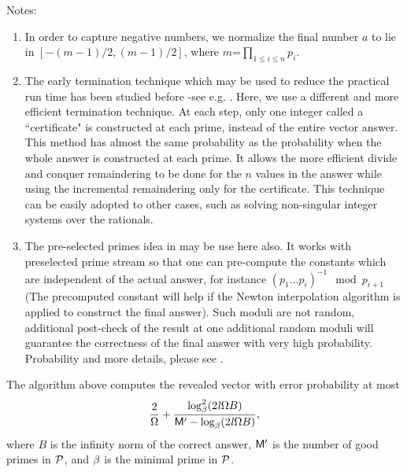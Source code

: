 Notes:
\begin{enumerate}
\item
In order to capture negative numbers, 
we normalize the final number $a$ to lie in $[-(m-1)/2, (m-1)/2]$, 
where $m$=$\prod_{1\leq i \leq n} p_i$.
\item
The early termination technique which may be used to reduce 
the practical run time
has been studied before -see e.g. \cite{Emiris98,Kaltofen02, Eberly03}.
Here, we use a different and more efficient termination technique.
At each step, only one integer called a ``certificate" is constructed 
at each prime, instead of the entire vector answer. This method has almost
the same probability as the probability when the whole answer is constructed at each prime.  It allows the more efficient divide and conquer remaindering
to be done for the $n$ values in the answer while using the incremental
remaindering only for the certificate.
This technique can be easily adopted to other cases,
such as solving non-singular integer systems over the rationals.
\item
The pre-selected primes idea in \cite{Kaltofen02} may be use here also. 
It works with preselected prime stream%
so that one can pre-compute the constants 
which are independent of the actual answer,
for instance $(p_1 \ldots p_i)^{-1} \mod p_{i+1}$ (The precomputed constant 
will help if the Newton interpolation algorithm is applied to construct the
final answer). Such moduli are not random, additional post-check of the result
at one additional random moduli will guarantee the correctness of the final 
answer with very high probability. Probability and more details, please
see \cite{Kaltofen02}.
\end{enumerate}
\begin{theorem}
The algorithm above computes the revealed vector with error probability at most 
\[\frac{2}{\Omega} +
\frac{\log^2_{\beta}(2\mathit l \Omega B)}
{\mathsf M^\prime - \log_{\beta}(2\mathit l \Omega B)},\]
where $B$ is the infinity norm of the correct answer,
$\mathsf M^\prime$ is the number of good primes in $\mathcal P$,
and $\beta$ is the minimal prime in $\mathcal P$.
\end{theorem}

